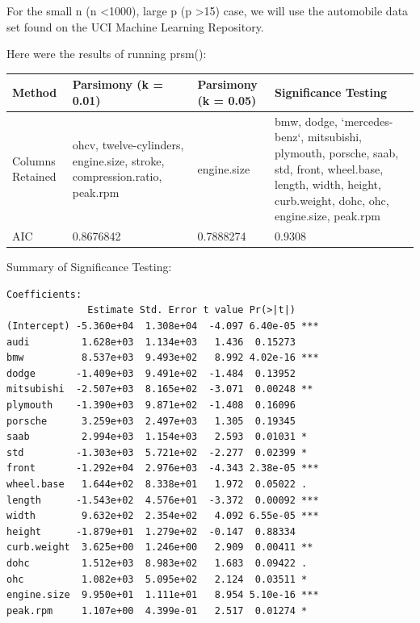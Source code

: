 \documentclass[letter]{article}
\begin{document}


For the small n (n \textless 1000), large p (p \textgreater 15) case, we will use the automobile data set found on the UCI Machine Learning Repository.

Here were the results of running prsm(): \\

\begin{center}
    \begin{tabular}{ | l |  p{4cm} |  p{4cm} | p{4cm} |}
    \hline
    Method & Parsimony (k = 0.01) & Parsimony (k = 0.05) & Significance Testing \\ \hline
    
    Columns Retained & ohcv, twelve-cylinders, engine.size, stroke, compression.ratio, peak.rpm & engine.size & bmw, dodge, `mercedes-benz`, mitsubishi, plymouth, porsche, saab, std, front, wheel.base, length, width, height, curb.weight, dohc, ohc, engine.size, peak.rpm\\ \hline
    
    AIC & 0.8676842 & 0.7888274 & 0.9308\\ \hline
    
    \end{tabular}
\end{center}

Summary of Significance Testing:\\
\begin{verbatim}
Coefficients:
              Estimate Std. Error t value Pr(>|t|)    
(Intercept) -5.360e+04  1.308e+04  -4.097 6.40e-05 ***
audi         1.628e+03  1.134e+03   1.436  0.15273    
bmw          8.537e+03  9.493e+02   8.992 4.02e-16 ***
dodge       -1.409e+03  9.491e+02  -1.484  0.13952    
mitsubishi  -2.507e+03  8.165e+02  -3.071  0.00248 ** 
plymouth    -1.390e+03  9.871e+02  -1.408  0.16096    
porsche      3.259e+03  2.497e+03   1.305  0.19345    
saab         2.994e+03  1.154e+03   2.593  0.01031 *  
std         -1.303e+03  5.721e+02  -2.277  0.02399 *  
front       -1.292e+04  2.976e+03  -4.343 2.38e-05 ***
wheel.base   1.644e+02  8.338e+01   1.972  0.05022 .  
length      -1.543e+02  4.576e+01  -3.372  0.00092 ***
width        9.632e+02  2.354e+02   4.092 6.55e-05 ***
height      -1.879e+01  1.279e+02  -0.147  0.88334    
curb.weight  3.625e+00  1.246e+00   2.909  0.00411 ** 
dohc         1.512e+03  8.983e+02   1.683  0.09422 .  
ohc          1.082e+03  5.095e+02   2.124  0.03511 *  
engine.size  9.950e+01  1.111e+01   8.954 5.10e-16 ***
peak.rpm     1.107e+00  4.399e-01   2.517  0.01274 *  
\end{verbatim}
\end{document}
